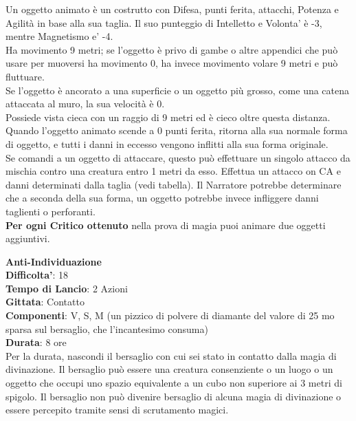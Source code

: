\begin{multicols}{2}

Un oggetto animato è un costrutto con Difesa, punti ferita, attacchi, Potenza e Agilità in base alla sua taglia. Il suo punteggio di Intelletto e Volonta' è -3, mentre Magnetismo e' -4.\\
Ha movimento 9 metri; se l’oggetto è privo di gambe o altre appendici che può usare per muoversi ha movimento 0, ha invece movimento volare 9 metri e può fluttuare. 
\\Se l’oggetto è ancorato a una superficie o un oggetto più grosso, come una catena attaccata al muro, la sua velocità è 0.\\
Possiede vista cieca con un raggio di 9 metri ed è cieco oltre questa distanza.\\
Quando l’oggetto animato scende a 0 punti ferita, ritorna alla sua normale forma di oggetto, e tutti i danni in eccesso vengono inflitti alla sua forma originale.\\
Se comandi a un oggetto di attaccare, questo può effettuare un singolo attacco da mischia contro una creatura entro 1 metri da esso. Effettua un attacco on CA e danni determinati dalla taglia (vedi tabella). Il Narratore potrebbe determinare che a seconda della sua forma, un oggetto potrebbe invece infliggere danni taglienti o perforanti.\\
\textbf{Per ogni Critico ottenuto} nella prova di magia puoi animare due oggetti aggiuntivi.

\medskip\textbf{Anti-Individuazione}\\
\textbf{Difficolta'}: 18\\
\textbf{Tempo di Lancio}: 2 Azioni\\
\textbf{Gittata}: Contatto\\
\textbf{Componenti}: V, S, M (un pizzico di polvere di diamante del valore di 25 mo sparsa sul bersaglio, che l’incantesimo consuma)\\
\textbf{Durata}: 8 ore\\
Per la durata, nascondi il bersaglio con cui sei stato in contatto dalla magia di divinazione. Il bersaglio può essere una creatura consenziente o un luogo o un oggetto che occupi uno spazio equivalente a un cubo non superiore ai 3 metri di spigolo. Il bersaglio non può divenire bersaglio di alcuna magia di divinazione o essere percepito tramite sensi di scrutamento magici.


\end{multicols}
